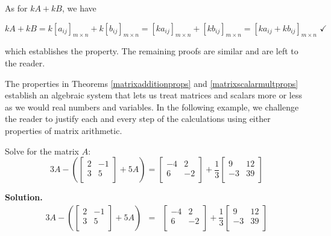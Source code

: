 \documentclass{ximera}
\begin{document}
As for $kA + kB$, we have

\[ kA + kB = k\left[a_{ij}\right]_{m \times n}+k\left[b_{ij}\right]_{m \times n} =  \left[ka_{ij}\right]_{m \times n}+\left[kb_{ij}\right]_{m \times n} = \left[ka_{ij} + kb_{ij}\right]_{m \times n} \, \, \checkmark \]

which establishes the property.  The remaining proofs are similar and are left to the reader.  


The properties in Theorems \ref{matrixadditionprops} and \ref{matrixscalarmultprops} establish an algebraic system that lets us treat matrices and scalars more or less as we would real numbers and variables.  In the following example, we challenge the reader to justify each and every step of the calculations using either properties of matrix arithmetic.

\begin{ex} \label{matrixaddscalarex} Solve for the matrix $A$:  \[3A - \left(\left[ \begin{array}{rr} 2 & -1 \\ 3 & 5 \\ \end{array}\right] + 5A\right) = \left[ \begin{array}{rr} -4 & 2 \\ 6 & -2 \\ \end{array}\right] + \dfrac{1}{3} \left[ \begin{array}{rr} 9 & 12 \\ -3 & 39 \\ \end{array}\right] \]
\newpage

{\bf Solution.} \[ \begin{array}{rcl}

3A - \left(\left[ \begin{array}{rr} 2 & -1 \\ 3 & 5 \\ \end{array}\right] + 5A\right) & = & \left[ \begin{array}{rr} -4 & 2 \\ 6 & -2 \\ \end{array}\right] + \dfrac{1}{3} \left[ \begin{array}{rr} 9 & 12 \\ -3 & 39 \\ \end{array}\right]  \\ [13pt]




\end{array}\]
\end{ex}
\end{document}
